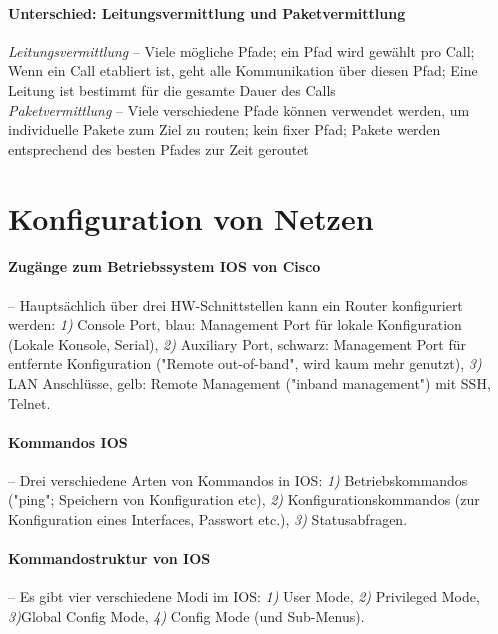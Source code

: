 \documentclass[a4paper,12pt]{article}
\begin{document}
\newpage
\paragraph{Unterschied: Leitungsvermittlung und Paketvermittlung} \emph{Leitungsvermittlung} -- Viele mögliche Pfade; ein Pfad wird gewählt pro Call; Wenn ein Call etabliert ist, geht alle Kommunikation über diesen Pfad; Eine Leitung ist bestimmt für die gesamte Dauer des Calls\\
\emph{Paketvermittlung} -- Viele verschiedene Pfade können verwendet werden, um individuelle Pakete zum Ziel zu routen; kein fixer Pfad; Pakete werden entsprechend des besten Pfades zur Zeit geroutet \\

\newpage
\section{Konfiguration von Netzen}
\paragraph{Zugänge zum Betriebssystem IOS von Cisco} -- Hauptsächlich über drei HW-Schnittstellen kann ein Router konfiguriert werden: \emph{1)} Console Port, blau: Management Port für lokale Konfiguration (Lokale Konsole, Serial), \emph{2)} Auxiliary Port, schwarz: Management Port für entfernte Konfiguration ("Remote out-of-band", wird kaum mehr genutzt), \emph{3)} LAN Anschlüsse, gelb: Remote Management ("inband management") mit SSH, Telnet.



\paragraph{Kommandos IOS} -- Drei verschiedene Arten von Kommandos in IOS: \emph{1)} Betriebskommandos ("ping"; Speichern von Konfiguration etc), \emph{2)} Konfigurationskommandos (zur Konfiguration eines Interfaces, Passwort etc.), \emph{3)} Statusabfragen.

\paragraph{Kommandostruktur von IOS} -- Es gibt vier verschiedene Modi im IOS: \emph{1)} User Mode, \emph{2)} Privileged Mode, \emph{3)}Global Config Mode, \emph{4)} Config Mode (und Sub-Menus).
\end{document}

